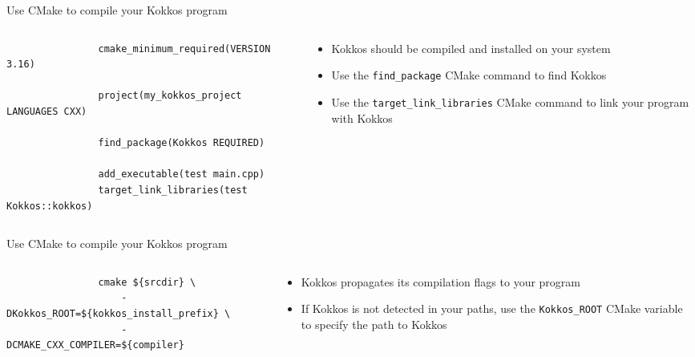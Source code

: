 \documentclass[aspectratio=169]{beamer}
\begin{document}

\begin{frame}[fragile]{Use CMake to compile your Kokkos program}
    \begin{columns}
        \begin{column}{0.6\linewidth}
            \begin{verbatim}
                cmake_minimum_required(VERSION 3.16)

                project(my_kokkos_project LANGUAGES CXX)

                find_package(Kokkos REQUIRED)

                add_executable(test main.cpp)
                target_link_libraries(test Kokkos::kokkos)
            \end{verbatim}
        \end{column}
        \begin{column}{0.4\linewidth}
            \begin{itemize}
                \item Kokkos should be compiled and installed on your system
                \item Use the \texttt{find\_package} CMake command to find Kokkos
                \item Use the \texttt{target\_link\_libraries} CMake command to link your program with Kokkos
            \end{itemize}
        \end{column}
    \end{columns}
\end{frame}


\begin{frame}[fragile]{Use CMake to compile your Kokkos program}
    \begin{columns}
        \begin{column}{0.6\linewidth}
            \begin{verbatim}
                cmake ${srcdir} \
                    -DKokkos_ROOT=${kokkos_install_prefix} \
                    -DCMAKE_CXX_COMPILER=${compiler}
            \end{verbatim}
        \end{column}
        \begin{column}{0.4\linewidth}
            \begin{itemize}
                \item Kokkos propagates its compilation flags to your program
                \item If Kokkos is not detected in your paths, use the \texttt{Kokkos\_ROOT} CMake variable to specify the path to Kokkos
            \end{itemize}
        \end{column}
    \end{columns}
\end{frame}
\end{document}
